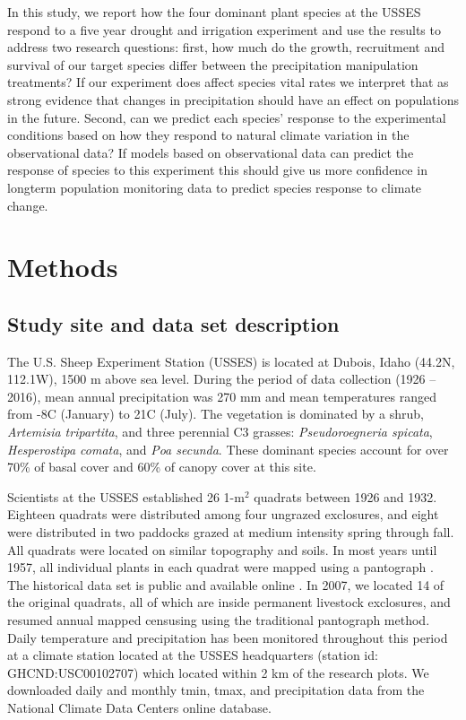 \documentclass[11pt]{article}
\begin{document}
\begin{doublespacing}
In this study, we report how the four dominant plant species at the USSES respond to a five year drought and irrigation experiment and use the results to address two research questions: first, how much do the growth, recruitment and survival of our target species differ between the precipitation manipulation treatments? If our experiment does affect species vital rates we interpret that as strong evidence that changes in precipitation should have an effect on populations in the future. Second, can we predict each species' response to the experimental conditions based on how they respond to natural climate variation in the observational data? If models based on observational data can predict the response of species to this experiment this should give us more confidence in longterm population monitoring data to predict species response to climate change. 

\section*{Methods}

\subsection*{Study site and data set description}

The U.S. Sheep Experiment Station (USSES) is located at Dubois, Idaho (44.2\degree N, 112.1\degree W), 1500 m above sea level. During the period of data collection (1926 – 2016), mean annual precipitation was 270 mm and mean temperatures ranged from -8\degree C (January) to 21\degree C (July). The vegetation is dominated by a shrub, \textit{Artemisia tripartita}, and three perennial C3 grasses: \textit{Pseudoroegneria spicata}, \textit{Hesperostipa comata}, and \textit{Poa secunda}. These dominant species account for over 70\% of basal cover and 60\% of canopy cover at this site. 

Scientists at the USSES established 26 1-m$^2$ quadrats between 1926 and 1932. Eighteen quadrats were distributed among four ungrazed exclosures, and eight were distributed in two paddocks grazed at medium intensity spring through fall. All quadrats were located on similar topography and soils. In most years until 1957, all individual plants in each quadrat were mapped using a pantograph \citep{blaisdell_}. The historical data set is public and available online \citep{zachmann_mapped_2010}. In 2007, we located 14 of the original quadrats, all of which are inside permanent livestock exclosures, and resumed annual mapped censusing using the traditional pantograph method. Daily temperature and precipitation has been monitored throughout this period at a climate station located at the USSES headquarters (station id: GHCND:USC00102707) which located within 2 km of the research plots.  We downloaded daily and monthly tmin, tmax, and precipitation data from the National Climate Data Centers online database.  


\end{doublespacing}
\end{document}
